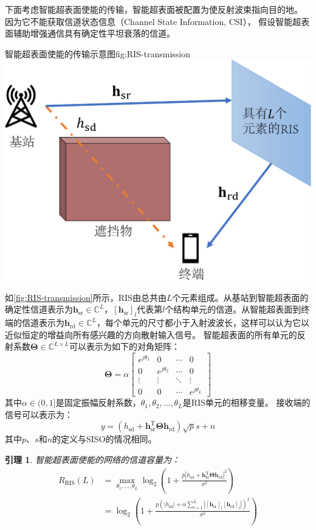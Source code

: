 \documentclass[supercite]{HustGraduPaper}
\newtheorem{lemma}{\indent 引理}[section]
\begin{document}
下面考虑智能超表面使能的传输，智能超表面被配置为使反射波束指向目的地。
因为它不能获取信道状态信息（Channel State Information, CSI），
假设智能超表面辅助增强通信具有确定性平坦衰落的信道。

\begin{generalfig}[htb]{智能超表面使能的传输示意图}{fig:RIS-transmission}
	\includegraphics[width=0.6\linewidth]{Figures/RIS-transmission.pdf}
\end{generalfig}

如\autoref{fig:RIS-transmission}所示，RIS由总共由$L$个元素组成。从基站到智能超表面的确定性信道表示为$\mathbf{h}_{\mathrm{sr}} \in \mathbb{C}^{L}$，$\left[\mathbf{h}_{\mathrm{sr}}\right]_{l}$代表第$l$个结构单元的信道。从智能超表面到终端的信道表示为$\mathbf{h}_{\mathrm{rd}} \in \mathbb{C}^{L}$，每个单元的尺寸都小于入射波波长，这样可以认为它以近似恒定的增益向所有感兴趣的方向散射输入信号\cite{emil2019intelligent}。
智能超表面的所有单元的反射系数$\boldsymbol{\Theta} \in \mathbb{C}^{L\times L}$可以表示为如下的对角矩阵：
\begin{equation}
	\boldsymbol{\Theta}=\alpha
	\begin{bmatrix}  
  		e^{j \theta_{1}} & 0 & \cdots & 0 \\  
  		0 & e^{j \theta_{2}} & \cdots & 0 \\  
  		\vdots & \vdots & \ddots & \vdots \\  
  		0 & 0 & \cdots & e^{j \theta_{L}}  
	\end{bmatrix}
\end{equation}
其中$\alpha \in (0,1]$是固定振幅反射系数，$\theta_{1}, \theta_{2},\ldots, \theta_{L}$是RIS单元的相移变量。
接收端的信号可以表示为：
\begin{equation}
	y=\left(h_{\mathrm{sd}}+\mathbf{h}_{\mathrm{sr}}^{\mathrm{T}} \boldsymbol{\Theta} \mathbf{h}_{\mathrm{rd}}\right) \sqrt{p} s+n
\end{equation}
其中$p$、$s$和$n$的定义与SISO的情况相同。

\begin{lemma}
	智能超表面使能的网络的信道容量为：
	\begin{align}
		R_{\mathrm{RIS}}(L) &=\max _{\theta_{1}, \ldots, \theta_{L}} \log _{2}\left(1+\frac{p\left|h_{\mathrm{sd}}+\mathbf{h}_{\mathrm{sr}}^{\mathrm{T}} \boldsymbol{\Theta} \mathbf{h}_{\mathrm{rd}}\right|^{2}}{\sigma^{2}}\right) \label{eq:R-RIS1} \\
		&=\log _{2}\left(1+\frac{p\left(\left|h_{\mathrm{sd}}\right|+\alpha \sum_{l=1}^{L}\left|\left[\mathbf{h}_{\mathrm{sr}}\right]_{l}\left[\mathbf{h}_{\mathrm{rd}}\right]_{l}\right|\right)^{2}}{\sigma^{2}}\right)
	\end{align}
\end{lemma}
\end{document}
